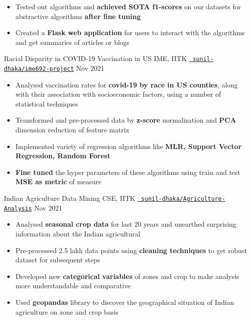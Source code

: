 {\begin{itemize}
  \item Tested out algorithms and \textbf{achieved SOTA f1-scores} on our datasets for abstractive algorithms \textbf{after fine tuning}
  \item Created a \textbf{Flask web application} for users to interact with the algorithms and get summaries of articles or blogs%
  
\end{itemize}
}

\cventry
{Racial Disparity in COVID-19 Vaccination in US}
{IME, IITK}
{\texttt{\href{https://github.com/sunil-dhaka/ime692-project}{\faGithub{} sunil-dhaka/ime692-project}}}
{Nov 2021}
{
  \begin{itemize}
    \item Analysed vaccination rates for \textbf{covid-19 by race in US counties}, along with their association with socioeconomic factors, using a number of statistical techniques
    \item Transformed and pre-processed data by \textbf{z-score} normalization and \textbf{PCA} dimension reduction of feature matrix
    \item Implemented variety of regression algorithms like \textbf{MLR, Support Vector Regression, Random Forest}
    \item \textbf{Fine tuned} the hyper parameters of these algorithms using train and test \textbf{MSE as metric} of measure  
  \end{itemize}
}

\cventry
{Indian Agriculture Data Mining}
{CSE, IITK}
{\texttt{\href{https://github.com/sunil-dhaka/Agriculture-Analysis-on-Indian-States}{\faGithub{} sunil-dhaka/Agriculture-Analysis}}}
{Nov 2021}
{
  \begin{itemize}
    \item Analysed \textbf{seasonal crop data} for last 20 years and unearthed surprising information about the Indian agricultural
    \item Pre-processed 2.5 lakh data points using \textbf{cleaning techniques} to get robust dataset for subsequent steps
    \item Developed new \textbf{categorical variables} of zones and crop to make analysis more understandable and comparative
    \item Used \textbf{geopandas} library to discover the geographical situation of Indian agriculture on zone and crop basis
  \end{itemize}
}

